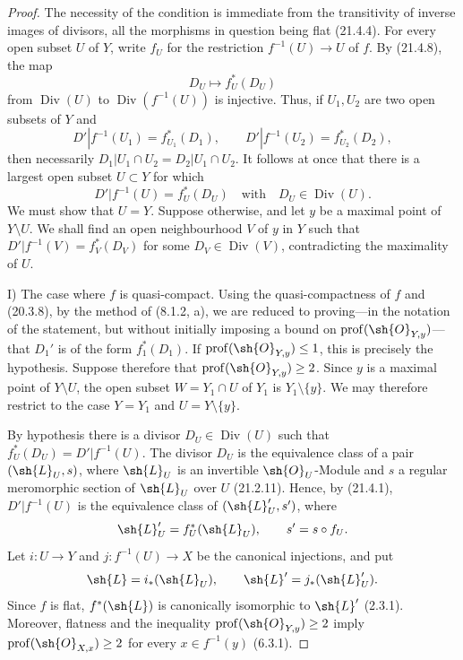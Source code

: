 \begin{proof}
The necessity of the condition is immediate from the transitivity of
inverse images of divisors, all the morphisms in question being flat
(21.4.4).  For every open subset $U$ of $Y$, write $f_U$ for the
restriction $f^{-1}(U)\to U$ of $f$.  By (21.4.8), the map
\[
 D_U\longmapsto f_U^*(D_U)
\]
from $\operatorname{Div}(U)$ to
$\operatorname{Div}(f^{-1}(U))$ is injective.  Thus, if $U_1,U_2$ are
two open subsets of $Y$ and
\[
 D'|f^{-1}(U_1)=f_{U_1}^*(D_1),\qquad
 D'|f^{-1}(U_2)=f_{U_2}^*(D_2),
\]
then necessarily
$D_1|U_1\cap U_2=D_2|U_1\cap U_2$.  It follows at once that there is a
largest open subset $U\subset Y$ for which
\[
 D'|f^{-1}(U)=f_U^*(D_U)
 \quad\text{with}\quad D_U\in\operatorname{Div}(U).
\]
We must show that $U=Y$.  Suppose otherwise, and let $y$ be a maximal
point of $Y\setminus U$.  We shall find an open neighbourhood $V$ of
$y$ in $Y$ such that
$D'|f^{-1}(V)=f_V^*(D_V)$ for some
$D_V\in\operatorname{Div}(V)$, contradicting the maximality of $U$.

\textup{I) The case where $f$ is quasi-compact.}
Using the quasi-compactness of $f$ and (20.3.8), by the method of
(8.1.2, a), we are reduced to proving---in the notation of the
statement, but without initially imposing a bound on
$\operatorname{prof}(\sh{O}_{Y,y})$---that $D_1'$ is of the form
$f_1^*(D_1)$.  If $\operatorname{prof}(\sh{O}_{Y,y})\leq 1$, this is
precisely the hypothesis.  Suppose therefore that
$\operatorname{prof}(\sh{O}_{Y,y})\geq 2$.  Since $y$ is a maximal
point of $Y\setminus U$, the open subset $W=Y_1\cap U$ of $Y_1$ is
$Y_1\setminus\{y\}$.  We may therefore restrict to the case
$Y=Y_1$ and $U=Y\setminus\{y\}$.

By hypothesis there is a divisor $D_U\in\operatorname{Div}(U)$ such
that $f_U^*(D_U)=D'|f^{-1}(U)$.  The divisor $D_U$ is the equivalence
class of a pair $(\sh{L}_U,s)$, where $\sh{L}_U$ is an invertible
$\sh{O}_U$-Module and $s$ a regular meromorphic section of $\sh{L}_U$
over $U$ (21.2.11).  Hence, by (21.4.1), $D'|f^{-1}(U)$ is the
equivalence class of $(\sh{L}'_U,s')$, where
\[
 \sh{L}'_U=f_U^*(\sh{L}_U),\qquad s'=s\circ f_U.
\]
Let $i:U\to Y$ and $j:f^{-1}(U)\to X$ be the canonical injections,
and put
\[
 \sh{L}=i_*(\sh{L}_U),\qquad
 \sh{L}'=j_*(\sh{L}'_U).
\]
Since $f$ is flat, $f^*(\sh{L})$ is canonically isomorphic to
$\sh{L}'$ (2.3.1).  Moreover, flatness and the inequality
$\operatorname{prof}(\sh{O}_{Y,y})\geq 2$ imply
$\operatorname{prof}(\sh{O}_{X,x})\geq 2$ for every
$x\in f^{-1}(y)$ (6.3.1).


\end{proof}
